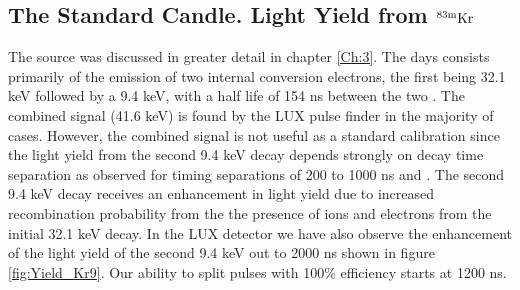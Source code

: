 \subsection{The Standard Candle. Light Yield from $\rm^{83m}Kr$}


The \KrCal source was discussed in greater detail in chapter \ref{Ch:3}. The days consists primarily of the emission of two internal conversion electrons, the first being 32.1 keV followed by a 9.4 keV, with a half life of 154 ns between the two \cite{Kastens} \cite{83Kr_HalfLife_1} \cite{83Kr_HalfLife_2} . The combined signal (41.6 keV) is found by the LUX pulse finder in the majority of cases. However, the combined signal is not useful as a standard calibration since the light yield from the second 9.4 keV decay depends strongly on decay time separation as observed for timing separations of 200 to 1000 ns \cite{Kastens} and \cite{Baudis}. The second 9.4 keV decay receives an enhancement in light yield due to increased recombination probability from the the presence of ions and electrons from the initial 32.1 keV decay. In the LUX detector we have also observe the enhancement of the light yield of the second 9.4 keV out to 2000 ns shown in figure \ref{fig:Yield_Kr9}. Our ability to split pulses with 100\% efficiency starts at 1200 ns.

